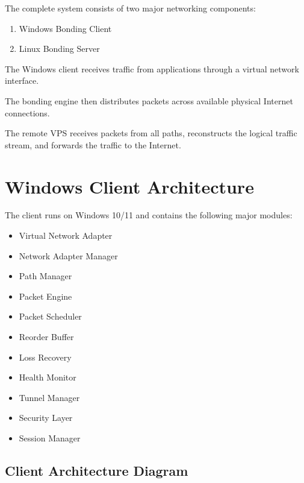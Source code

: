 \documentclass[12pt,a4paper]{article}
\begin{document}
The complete system consists of two major networking components:

\begin{enumerate}
    \item Windows Bonding Client
    \item Linux Bonding Server
\end{enumerate}

The Windows client receives traffic from applications through a virtual network interface.

The bonding engine then distributes packets across available physical Internet connections.

The remote VPS receives packets from all paths, reconstructs the logical traffic stream, and forwards the traffic to the Internet.


\section{Windows Client Architecture}

The client runs on Windows 10/11 and contains the following major modules:

\begin{itemize}
    \item Virtual Network Adapter
    \item Network Adapter Manager
    \item Path Manager
    \item Packet Engine
    \item Packet Scheduler
    \item Reorder Buffer
    \item Loss Recovery
    \item Health Monitor
    \item Tunnel Manager
    \item Security Layer
    \item Session Manager
\end{itemize}

\subsection{Client Architecture Diagram}
\end{document}
